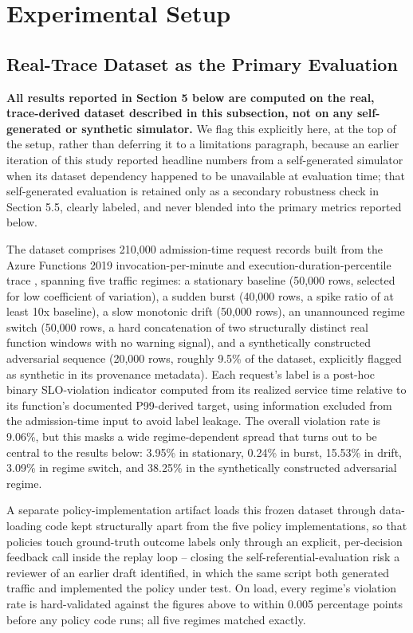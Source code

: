 \documentclass[11pt,letterpaper]{article}
\begin{document}
\section{Experimental Setup}

\subsection{Real-Trace Dataset as the Primary Evaluation}

\textbf{All results reported in Section 5 below are computed on the real, trace-derived dataset described in this subsection, not on any self-generated or synthetic simulator.} We flag this explicitly here, at the top of the setup, rather than deferring it to a limitations paragraph, because an earlier iteration of this study reported headline numbers from a self-generated simulator when its dataset dependency happened to be unavailable at evaluation time; that self-generated evaluation is retained only as a secondary robustness check in Section 5.5, clearly labeled, and never blended into the primary metrics reported below.

The dataset comprises 210,000 admission-time request records built from the Azure Functions 2019 invocation-per-minute and execution-duration-percentile trace \citep{Shahrad2020}, spanning five traffic regimes: a stationary baseline (50,000 rows, selected for low coefficient of variation), a sudden burst (40,000 rows, a spike ratio of at least 10x baseline), a slow monotonic drift (50,000 rows), an unannounced regime switch (50,000 rows, a hard concatenation of two structurally distinct real function windows with no warning signal), and a synthetically constructed adversarial sequence (20,000 rows, roughly 9.5\% of the dataset, explicitly flagged as synthetic in its provenance metadata). Each request's label is a post-hoc binary SLO-violation indicator computed from its realized service time relative to its function's documented P99-derived target, using information excluded from the admission-time input to avoid label leakage. The overall violation rate is 9.06\%, but this masks a wide regime-dependent spread that turns out to be central to the results below: 3.95\% in stationary, 0.24\% in burst, 15.53\% in drift, 3.09\% in regime switch, and 38.25\% in the synthetically constructed adversarial regime.

A separate policy-implementation artifact loads this frozen dataset through data-loading code kept structurally apart from the five policy implementations, so that policies touch ground-truth outcome labels only through an explicit, per-decision feedback call inside the replay loop -- closing the self-referential-evaluation risk a reviewer of an earlier draft identified, in which the same script both generated traffic and implemented the policy under test. On load, every regime's violation rate is hard-validated against the figures above to within 0.005 percentage points before any policy code runs; all five regimes matched exactly.
\end{document}
